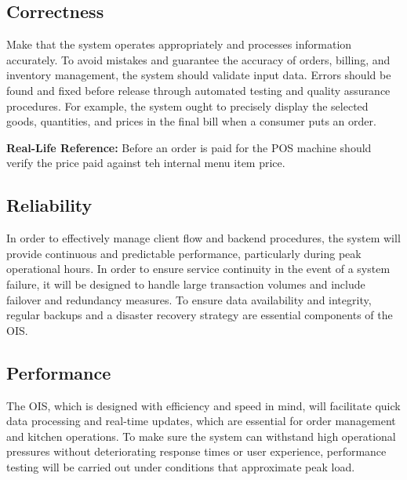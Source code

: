 \documentclass{article}
\begin{document}
\subsection{Correctness}
Make that the system operates appropriately and processes information accurately. To avoid mistakes and guarantee the accuracy of orders, billing, and inventory management, the system should validate input data. Errors should be found and fixed before release through automated testing and quality assurance procedures. For example, the system ought to precisely display the selected goods, quantities, and prices in the final bill when a consumer puts an order. 


\textbf{Real-Life Reference: }  Before an order is paid for the POS machine should verify the price paid against teh internal menu item price.
\subsection{Reliability } 
In order to effectively manage client flow and backend procedures, the system will provide continuous and predictable performance, particularly during peak operational hours. In order to ensure service continuity in the event of a system failure, it will be designed to handle large transaction volumes and include failover and redundancy measures. To ensure data availability and integrity, regular backups and a disaster recovery strategy are essential components of the OIS.
\subsection{Performance}
The OIS, which is designed with efficiency and speed in mind, will facilitate quick data processing and real-time updates, which are essential for order management and kitchen operations. To make sure the system can withstand high operational pressures without deteriorating response times or user experience, performance testing will be carried out under conditions that approximate peak load. 


\clearpage



\end{document}

